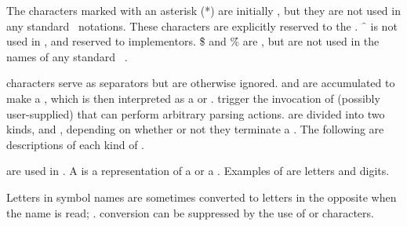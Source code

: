 The characters marked with an asterisk (*) are initially ,
%                     
but they are not used in any standard \clisp\ notations.
These characters are explicitly reserved to the .
\f{~} is not used in \clisp, and reserved to implementors.
\f{\$} and \f{\%} are  ,
but are not used in the names of any standard \clisp\ .

 characters serve as separators but are otherwise
ignored.   and   are accumulated
to make a , which is then interpreted as a  or .
 trigger the invocation of  (possibly
user-supplied) that can perform arbitrary parsing actions.
 are divided into two kinds,
 and ,
depending on whether or not they terminate a .
The following are descriptions of each kind of .


  are used in .
A  is a representation of a  or a .  
Examples of   are letters and digits.

Letters in symbol names are sometimes converted to 
letters in the opposite  when the name is read;
\seesection\ReadtableCaseReadEffect.
 conversion can be suppressed by the use 
of  or  characters.

